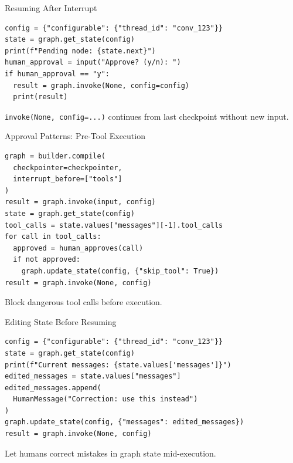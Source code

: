 \documentclass[aspectratio=169,11pt]{beamer}
\begin{document}
\begin{frame}[fragile]{Resuming After Interrupt}
  \begin{codebox}
    \begin{lstlisting}
config = {"configurable": {"thread_id": "conv_123"}}
state = graph.get_state(config)
print(f"Pending node: {state.next}")
human_approval = input("Approve? (y/n): ")
if human_approval == "y":
  result = graph.invoke(None, config=config)
  print(result)
    \end{lstlisting}
  \end{codebox}
  \vspace{0.1cm}
  \begin{tipbox}
    \texttt{invoke(None, config=...)} continues from last checkpoint without new input.
  \end{tipbox}
\end{frame}

\begin{frame}[fragile]{Approval Patterns: Pre-Tool Execution}
  \begin{codebox}
    \begin{lstlisting}
graph = builder.compile(
  checkpointer=checkpointer,
  interrupt_before=["tools"]
)
result = graph.invoke(input, config)
state = graph.get_state(config)
tool_calls = state.values["messages"][-1].tool_calls
for call in tool_calls:
  approved = human_approves(call)
  if not approved:
    graph.update_state(config, {"skip_tool": True})
result = graph.invoke(None, config)
    \end{lstlisting}
  \end{codebox}
  \vspace{0.1cm}
  \begin{tipbox}
    Block dangerous tool calls before execution.
  \end{tipbox}
\end{frame}

\begin{frame}[fragile]{Editing State Before Resuming}
  \begin{codebox}
    \begin{lstlisting}
config = {"configurable": {"thread_id": "conv_123"}}
state = graph.get_state(config)
print(f"Current messages: {state.values['messages']}")
edited_messages = state.values["messages"]
edited_messages.append(
  HumanMessage("Correction: use this instead")
)
graph.update_state(config, {"messages": edited_messages})
result = graph.invoke(None, config)
    \end{lstlisting}
  \end{codebox}
  \vspace{0.1cm}
  \begin{tipbox}
    Let humans correct mistakes in graph state mid-execution.
  \end{tipbox}
\end{frame}
\end{document}
